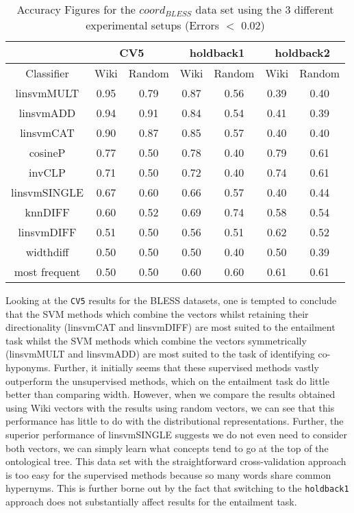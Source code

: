 \documentclass[11pt]{article}
\begin{document}
\begin{table*}[ht]
\centering
\begin{tabular}{|c|c|c|c|c|c|c|}
\hline
&\multicolumn{2}{|c|}{CV5}&\multicolumn{2}{|c|}{holdback1}&\multicolumn{2}{|c|}{holdback2}\\
\hline
Classifier&Wiki&Random&Wiki&Random&Wiki&Random\\
\hline
linsvmMULT&0.95&0.79&0.87&0.56&0.39&0.40\\
linsvmADD&0.94&0.91&0.84&0.54&0.41&0.39\\
linsvmCAT&0.90&0.87&0.85&0.57&0.40&0.40\\
cosineP&0.77&0.50&0.78&0.40&0.79&0.61\\
invCLP&0.71&0.50&0.72&0.40&0.74&0.61\\
linsvmSINGLE&0.67&0.60&0.66&0.57&0.40&0.44\\
knnDIFF&0.60&0.52&0.69&0.74&0.58&0.54\\
linsvmDIFF&0.51&0.50&0.56&0.51&0.62&0.52\\
widthdiff&0.50&0.50&0.50&0.40&0.50&0.39\\
most frequent&0.50&0.50&0.60&0.60&0.61&0.61\\
\hline
\end{tabular}
\caption{Accuracy Figures for the \emph{$coord_{BLESS}$} data set using the 3 different experimental setups (Errors $<$ 0.02)}
\label{table:results_coord_bless}
\end{table*}

Looking at the \texttt{CV5} results for the BLESS datasets, one is tempted to conclude that the SVM methods which combine the vectors whilst retaining their directionality (linsvmCAT and linsvmDIFF) are most suited to the entailment task whilst the SVM methods which combine the vectors symmetrically (linsvmMULT and linsvmADD) are most suited to the task of identifying co-hyponyms.  Further, it initially seems that these supervised methods vastly outperform the unsupervised methods, which on the entailment task do little better than comparing width.  However, when we compare the results obtained using Wiki vectors with the results using random vectors, we can see that this performance has little to do with the distributional representations.  Further, the superior performance of linsvmSINGLE suggests we do not even need to consider both vectors, we can simply learn what concepts tend to go at the top of the ontological tree.  This data set with the straightforward cross-validation approach is too easy for the supervised methods because so many words share common hypernyms.  This is further borne out by the fact that switching to the \texttt{holdback1} approach does not substantially affect results for the entailment task.
\end{document}
